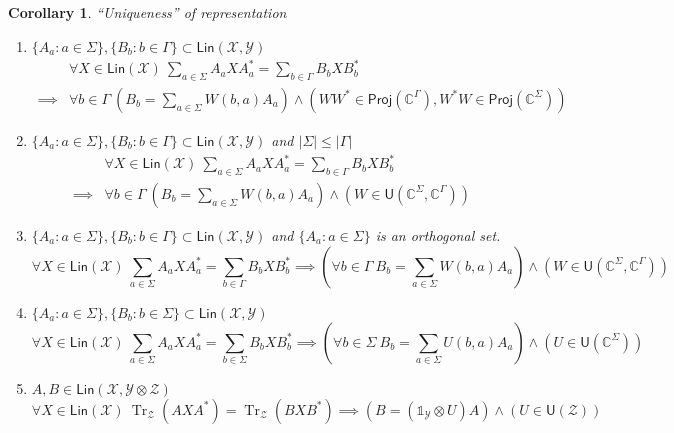 \documentclass[aps,pra,onecolumn,notitlepage,superscriptaddress]{revtex4-1}
\newcommand{\C}{\mathbb{C}}
\newcommand{\spc}[1]{\mathcal{#1}}
\newcommand{\Lin}{\mathsf{Lin}}
\newcommand{\Proj}{\mathsf{Proj}}
\newcommand{\U}{\mathsf{U}}
\newcommand{\Tr}{\operatorname{Tr}}
\newcommand\I{\mathds{1}}
\newtheorem{cor}{Corollary}
\begin{document}
    \begin{cor}
        ``Uniqueness'' of representation
        \begin{enumerate}
            \item $\{A_a : a \in \Sigma\}, \{B_b : b \in \Gamma\} \subset \Lin(\spc X,\spc Y)$
            \begin{align}
                &\forall X \in \Lin(\spc X) \ \sum_{a \in \Sigma} A_a X A_a^* = \sum_{b \in \Gamma} B_b X B_b^* \\
                \implies &\forall b \in \Gamma \ (B_b = \sum_{a \in \Sigma} W(b,a) A_a) \land (WW^* \in \Proj(\C^\Gamma), W^*W \in \Proj(\C^\Sigma))
            \end{align}
            \item $\{A_a : a \in \Sigma\}, \{B_b : b \in \Gamma\} \subset \Lin(\spc X,\spc Y)$ and $|\Sigma| \leq |\Gamma|$
            \begin{align}
                &\forall X \in \Lin(\spc X) \ \sum_{a \in \Sigma} A_a X A_a^* = \sum_{b \in \Gamma} B_b X B_b^* \\
                \implies &\forall b \in \Gamma \ (B_b = \sum_{a \in \Sigma} W(b,a) A_a) \land (W \in \U(\C^\Sigma, \C^\Gamma))
            \end{align}
            \item $\{A_a : a \in \Sigma\}, \{B_b : b \in \Gamma\} \subset \Lin(\spc X,\spc Y)$ and $\{A_a : a \in \Sigma\}$ is an orthogonal set.
            \begin{equation}
                \forall X \in \Lin(\spc X) \ \sum_{a \in \Sigma} A_a X A_a^* = \sum_{b \in \Gamma} B_b X B_b^* \implies  (\forall b \in \Gamma \ B_b = \sum_{a \in \Sigma} W(b,a) A_a) \land (W \in \U(\C^\Sigma, \C^\Gamma))
            \end{equation}
            \item $\{A_a : a \in \Sigma\}, \{B_b : b \in \Sigma\} \subset \Lin(\spc X,\spc Y)$
            \begin{equation}
                \forall X \in \Lin(\spc X) \ \sum_{a \in \Sigma} A_a X A_a^* = \sum_{b \in \Sigma} B_b X B_b^* \implies  (\forall b \in \Sigma \ B_b = \sum_{a \in \Sigma} U(b,a) A_a) \land (U \in \U(\C^\Sigma))
            \end{equation}
            \item $A,B \in \Lin(\spc X, \spc Y \otimes \spc Z)$
            \begin{equation}
                \forall X \in \Lin(\spc X) \ \Tr_{\spc Z}(AXA^*) = \Tr_{\spc Z}(BXB^*) \implies (B=(\I_{\spc Y} \otimes U)A) \land (U \in \U(\spc Z))
            \end{equation}
        \end{enumerate}
        
    \end{cor}
\end{document}
